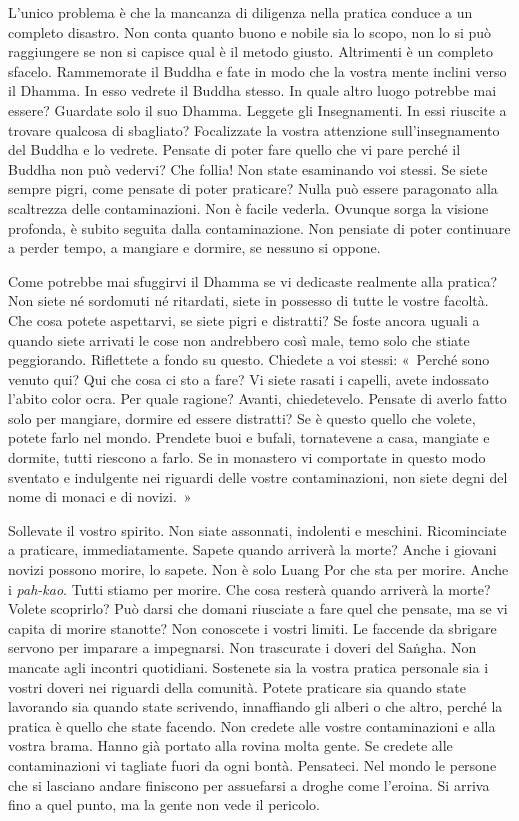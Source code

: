 L'unico problema è che la mancanza di diligenza nella pratica conduce a
un completo disastro. Non conta quanto buono e nobile sia lo scopo, non
lo si può raggiungere se non si capisce qual è il metodo giusto.
Altrimenti è un completo sfacelo. Rammemorate il Buddha e fate in modo
che la vostra mente inclini verso il Dhamma. In esso vedrete il Buddha
stesso. In quale altro luogo potrebbe mai essere? Guardate solo il suo
Dhamma. Leggete gli Insegnamenti. In essi riuscite a trovare qualcosa di
sbagliato? Focalizzate la vostra attenzione sull'insegnamento del Buddha
e lo vedrete. Pensate di poter fare quello che vi pare perché il Buddha
non può vedervi? Che follia! Non state esaminando voi stessi. Se siete
sempre pigri, come pensate di poter praticare? Nulla può essere
paragonato alla scaltrezza delle contaminazioni. Non è facile vederla.
Ovunque sorga la visione profonda, è subito seguita dalla
contaminazione. Non pensiate di poter continuare a perder tempo, a
mangiare e dormire, se nessuno si oppone.

Come potrebbe mai sfuggirvi il Dhamma se vi dedicaste realmente alla
pratica? Non siete né sordomuti né ritardati, siete in possesso di tutte
le vostre facoltà. Che cosa potete aspettarvi, se siete pigri e
distratti? Se foste ancora uguali a quando siete arrivati le cose non
andrebbero così male, temo solo che stiate peggiorando. Riflettete a
fondo su questo. Chiedete a voi stessi: «~Perché sono venuto qui? Qui
che cosa ci sto a fare? Vi siete rasati i capelli, avete indossato
l'abito color ocra. Per quale ragione? Avanti, chiedetevelo. Pensate di
averlo fatto solo per mangiare, dormire ed essere distratti? Se è questo
quello che volete, potete farlo nel mondo. Prendete buoi e bufali,
tornatevene a casa, mangiate e dormite, tutti riescono a farlo. Se in
monastero vi comportate in questo modo sventato e indulgente nei
riguardi delle vostre contaminazioni, non siete degni del nome di monaci
e di novizi.~»

Sollevate il vostro spirito. Non siate assonnati, indolenti e meschini.
Ricominciate a praticare, immediatamente. Sapete quando arriverà la
morte? Anche i giovani novizi possono morire, lo sapete. Non è solo
Luang Por che sta per morire. Anche i \emph{pah-kao}. Tutti stiamo per
morire. Che cosa resterà quando arriverà la morte? Volete scoprirlo? Può
darsi che domani riusciate a fare quel che pensate, ma se vi capita di
morire stanotte? Non conoscete i vostri limiti. Le faccende da sbrigare
servono per imparare a impegnarsi. Non trascurate i doveri del Saṅgha.
Non mancate agli incontri quotidiani. Sostenete sia la vostra pratica
personale sia i vostri doveri nei riguardi della comunità. Potete
praticare sia quando state lavorando sia quando state scrivendo,
innaffiando gli alberi o che altro, perché la pratica è quello che state
facendo. Non credete alle vostre contaminazioni e alla vostra brama.
Hanno già portato alla rovina molta gente. Se credete alle
contaminazioni vi tagliate fuori da ogni bontà. Pensateci. Nel mondo le
persone che si lasciano andare finiscono per assuefarsi a droghe come
l'eroina. Si arriva fino a quel punto, ma la gente non vede il pericolo.

